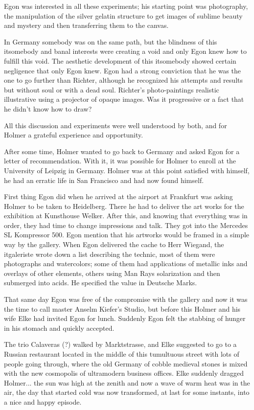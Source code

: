\documentclass[smalldemyvopaper,11pt,twoside,onecolumn,openright,extrafontsizes]{memoir}
\begin{document}
Egon was interested in all these experiments; his starting point was photography, the manipulation of the silver gelatin structure to get images of sublime beauty and mystery and then transferring them to the canvas.

In Germany somebody was on the same path, but the blindness of this \text it{somebody} and banal interests were creating a void and only Egon knew how to fulfill this void. The aesthetic development of this \text it{somebody} showed certain negligence that only Egon knew. Egon had a strong conviction that he was the one to go further than Richter, although he recognized his attempts and results but without soul or with a dead soul. Richter’s photo-paintings realistic illustrative using a projector of opaque images. Was it progressive or a fact that he didn't know how to draw?

All this discussion and experiments were well understood by both, and for Holmer a grateful experience and opportunity.

After some time, Holmer wanted to go back to Germany and asked Egon for a letter of recommendation. With it, it was possible for Holmer to enroll at the University of Leipzig in Germany. Holmer was at this point satisfied with himself, he had an erratic life in San Francisco and had now found himself.

First thing Egon did when he arrived at the airport at Frankfurt was asking Holmer to be taken to Heidelberg. There he had to deliver the art works for the exhibition at Kunsthouse Welker. After this, and knowing that everything was in order, they had time to change impressions and talk. They got into the Mercedes SL Kompressor 500. Egon mention that his artworks would be framed in a simple way by the gallery. When Egon delivered the  cache to Herr Wiegand, the \text it{galeriste} wrote down a list describing the technic, most of them were photographs and watercolors; some of them had applications of metallic inks and overlays of other elements, others using Man Rays solarization and then submerged into acids. He specified the value in Deutsche Marks.

That same day Egon was free of the compromise with the gallery and now it was the time to call master Anselm Kiefer’s Studio, but before this Holmer and his wife Elke had invited Egon for lunch. Suddenly Egon felt the stabbing of hunger in his stomach and quickly accepted.

The trio Calaveras (?) walked  by Marktstrasse, and Elke suggested to go to a Russian restaurant located in the middle of this tumultuous street with lots of people going through, where the old Germany of cobble medieval stones is mixed with the new cosmopolis of ultramodern business offices. Elke suddenly dragged Holmer... the sun was high at the zenith and now a wave of warm heat was in the air, the day that started cold was now transformed, at last for some instants, into a nice and happy episode.
\end{document}
